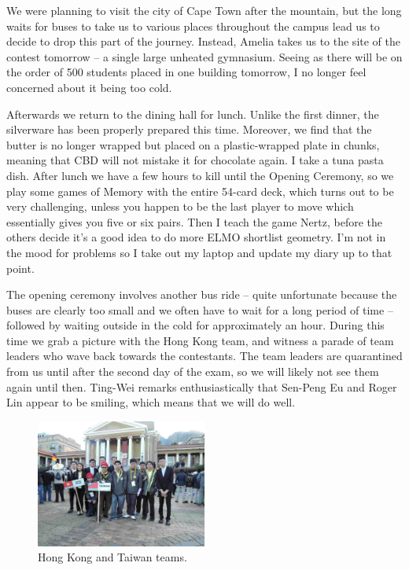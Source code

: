 \documentclass[11pt]{scrreprt}
\numberwithin{figure}{chapter}
\begin{document}
We were planning to visit the city of Cape Town after the mountain, but the long waits for buses to take us
to various places throughout the campus lead us to decide to drop this part of the journey. Instead, Amelia
takes us to the site of the contest tomorrow -- a single large unheated gymnasium.
Seeing as there will be on the order of 500 students placed in one building tomorrow, I no longer feel
concerned about it being too cold.

Afterwards we return to the dining hall for lunch. Unlike the first dinner, the silverware has been properly
prepared this time. Moreover, we find that the butter is no longer wrapped but placed on a plastic-wrapped plate
in chunks, meaning that CBD will not mistake it for chocolate again. I take a tuna pasta dish.
After lunch we have a few hours to kill until the Opening Ceremony, so we play some games of Memory with the entire
54-card deck, which turns out to be very challenging, unless you happen to be the last player to move which essentially
gives you five or six pairs.
Then I teach the game Nertz, before the others decide it's a good idea to do more ELMO shortlist geometry.
I'm not in the mood for problems so I take out my laptop and update my diary up to that point.

The opening ceremony involves another bus ride -- quite unfortunate because the buses are clearly too small and we often have
to wait for a long period of time -- followed by waiting outside in the cold for approximately an hour. During this time we grab
a picture with the Hong Kong team, and witness a parade of team leaders who wave back towards the contestants. The team leaders
are quarantined from us until after the second day of the exam, so we will likely not see them again until then.
Ting-Wei remarks enthusiastically that Sen-Peng Eu and Roger Lin appear to be smiling, which means that we will do well.

\begin{figure}[ht]
  \centering
  \includegraphics[width=0.5\textwidth]{media/hongkong_taiwan.jpg}
  \caption{Hong Kong and Taiwan teams.}
\end{figure}
\end{document}
